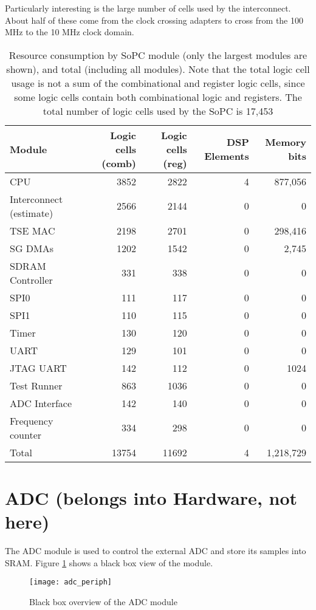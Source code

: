 Particularly interesting is the large number of cells used by the interconnect. About half of these
come from the clock crossing adapters to cross from the 100 MHz to the 10 MHz clock domain.

\begin{table}[h!]
\centering
\begin{tabular}{ | p{2cm} | r | r | r | r | }
 \hline
   Module       & Logic cells (comb) & Logic cells (reg) & DSP Elements & Memory bits \\
 \hline
   CPU & 3852 & 2822 & 4 & 877,056 \\
 \hline
   Interconnect (estimate) & 2566 & 2144 & 0 & 0\\
 \hline
   TSE MAC & 2198 & 2701 & 0 & 298,416 \\
 \hline
   SG DMAs & 1202 & 1542 & 0 & 2,745 \\
 \hline
   SDRAM Controller & 331 & 338 & 0 & 0 \\
 \hline
   SPI0 & 111 & 117 & 0 & 0 \\
 \hline
   SPI1 & 110 & 115 & 0 & 0 \\
\hline
   Timer & 130 & 120 & 0 & 0 \\
\hline
   UART & 129 & 101 & 0 & 0 \\
\hline
   JTAG UART & 142 & 112 & 0 & 1024 \\
\hline
   Test Runner & 863 & 1036 & 0 & 0 \\
\hline
   ADC Interface & 142 & 140 & 0 & 0 \\
 \hline
   Frequency counter & 334 & 298 & 0 & 0 \\
 \hline
 \hline
   Total & 13754 & 11692 & 4 & 1,218,729 \\
 \hline
\end{tabular}
\caption{Resource consumption by SoPC module (only the largest modules are shown), and total (including all modules). Note that the total logic cell usage is not a sum of the combinational and register logic cells, since some logic cells contain both combinational logic and registers. The total number of logic cells used by the SoPC is 17,453}
\label{table:linuxsys_resusage}
\end{table}




\section{ADC (belongs into Hardware, not here)}
The ADC module is used to control the external ADC and store its samples into SRAM.
Figure \ref{figure:adc_blackbox} shows a black box view of the module.
\begin{figure}[h!]
\begin{center}
\texttt{[image: adc\_periph]}
\caption{Black box overview of the ADC module}
\label{figure:adc_blackbox}
\end{center}
\end{figure}

